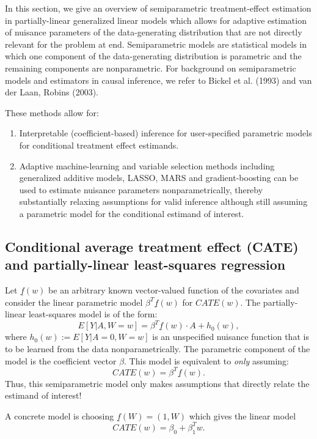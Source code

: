 \documentclass[article]{jss}
\begin{document}
In this section, we give an overview of semiparametric treatment-effect estimation in partially-linear generalized linear models which allows for adaptive estimation of nuisance parameters of the data-generating distribution that are not directly relevant for the problem at end. Semiparametric models are statistical models in which one component of the data-generating distribution is parametric and the remaining components are nonparametric. For background on semiparametric models and estimators in causal inference, we refer to Bickel et al. (1993) and van der Laan, Robins (2003).\nocite{vanderlaanunified}\nocite{bickel1993efficient}



These methods allow for:
\begin{enumerate}
\item Interpretable (coefficient-based) inference for user-specified parametric models for conditional treatment effect estimands.
\item Adaptive machine-learning and variable selection methods including generalized additive models, LASSO, MARS and gradient-boosting can be used to estimate nuisance parameters nonparametrically, thereby substantially relaxing assumptions for valid inference although still assuming a parametric model for the conditional estimand of interest.
\end{enumerate}

\subsection{Conditional average treatment effect (CATE) and partially-linear least-squares regression}
Let $\underline{f}(w)$ be an arbitrary known vector-valued function of the covariates and consider the linear parametric model $\beta^T \underline{f}(w)$ for $CATE(w)$. The partially-linear least-squares model is of the form:
$$E[Y|A,W=w] = \beta^T \underline{f}(w) \cdot A + h_0(w),$$
where $ h_0(w) := E[Y|A=0,W=w]$ is an unspecified nuisance function that is to be learned from the data nonparametrically. The parametric component of the model is the coefficient vector $\beta$. This model is equivalent to \textit{only} assuming:
$$CATE(w) = \beta^T \underline{f}(w).$$
Thus, this semiparametric model only makes assumptions that directly relate the estimand of interest! 

\noindent A concrete model is choosing $\underline{f}(W) = (1,W)$ which gives the linear model
$$CATE(w) = \beta_0 + \beta_1^T w.$$
\end{document}

